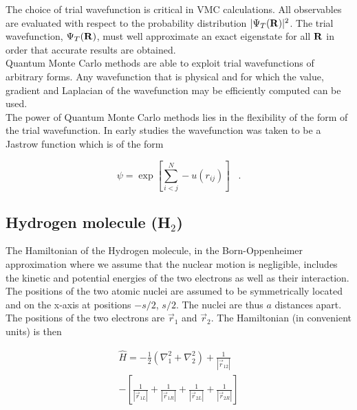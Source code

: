 \documentclass{article}
\begin{document}
The choice of trial wavefunction is critical in VMC calculations. All observables are evaluated with respect to the probability distribution  $\vert\Psi_T({\bf R})\vert^2$. The trial wavefunction,  $\Psi_T({\bf R})$, must well approximate an exact eigenstate for all ${\bf R}$ in order that accurate results are obtained. \\

Quantum Monte Carlo methods are able to exploit trial wavefunctions of arbitrary forms. Any wavefunction that is physical and for which the value, gradient and Laplacian of the wavefunction may be efficiently computed can be used\citep{phd}. \\

The power of Quantum Monte Carlo methods lies in the flexibility of the form of the trial wavefunction. In early studies the wavefunction was taken to be a Jastrow function \citep{jastrow1955many} which is of the form

\begin{equation}
\psi=\exp \left[ \sum_{i<j}^{N} -u(r_{ij}) \right] \;\;\;.
\end{equation}

\subsection{Hydrogen molecule (H$_2$)}

The Hamiltonian of the Hydrogen molecule, in the Born-Oppenheimer approximation where we assume that the nuclear motion is negligible, includes the kinetic and potential energies of the two electrons as well as their interaction. The positions of the two atomic nuclei are assumed to be symmetrically located and on the x-axis at positions $-s/2$, $s/2$. The nuclei are thus $a$ distances apart. The positions of the two electrons are $\vec{r}_1$ and $\vec{r}_2$. The Hamiltonian (in convenient units) is then

\begin{align}
\label{Hamiltonian}
 \hat{H}=-\frac{1}{2}\left( \nabla_1^2 + \nabla_2^2 \right) +\frac{1}{\left| \vec{r}_{12} \right|}  \\ - \left[ \frac{1}{|\vec{r}_{1L}|} +\frac{1}{|\vec{r}_{1R}|}+\frac{1}{|\vec{r}_{2L}|}+\frac{1}{|\vec{r}_{2R}|} \right] 
\end{align}
\end{document}
